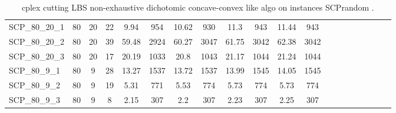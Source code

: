 \begin{sidewaystable}[!ht]
{\begin{tabular}{lccccccccccccccccccc}
SCP\_80\_20\_1 & 80 & 20 & 22 & 9.94 & 954 & 10.62 & 930 & 11.3 & 943 & 11.44 & 943 \\
SCP\_80\_20\_2 & 80 & 20 & 39 & 59.48 & 2924 & 60.27 & 3047 & 61.75 & 3042 & 62.38 & 3042 \\
SCP\_80\_20\_3 & 80 & 20 & 17 & 20.19 & 1033 & 20.8 & 1043 & 21.17 & 1044 & 21.24 & 1044 \\
SCP\_80\_9\_1 & 80 & 9 & 28 & 13.27 & 1537 & 13.72 & 1537 & 13.99 & 1545 & 14.05 & 1545 \\
SCP\_80\_9\_2 & 80 & 9 & 19 & 5.31 & 771 & 5.53 & 774 & 5.73 & 774 & 5.73 & 774 \\
SCP\_80\_9\_3 & 80 & 9 & 8 & 2.15 & 307 & 2.2 & 307 & 2.23 & 307 & 2.25 & 307 \\
\bottomrule
\end{tabular}
}%
\caption{cplex cutting LBS non-exhaustive dichotomic concave-convex like algo on instances SCPrandom .}
\label{tab:table2_lambda_limits_SCPrandom }
\end{sidewaystable}
